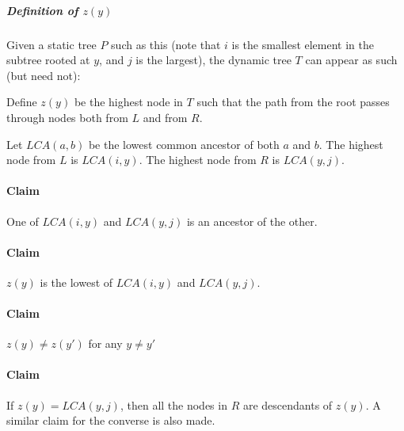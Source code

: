 \documentclass[a4paper]{article}
\begin{document}
\subparagraph{Definition of $z(y)$}
Given a static tree $P$ such as this (note that $i$ is the smallest element in the subtree rooted at $y$, and $j$ is the largest), the dynamic tree $T$ can appear as such (but need not):\\

Define $z(y)$ be the highest node in $T$ such that the path from the root passes through nodes both from $L$ and from $R$.

Let $LCA(a,b)$ be the lowest common ancestor of both $a$ and $b$.
The highest node from $L$ is $LCA(i, y)$. The highest node from $R$ is $LCA(y,j)$.

\paragraph{Claim}
One of $LCA(i,y)$ and $LCA(y,j)$ is an ancestor of the other.

\paragraph{Claim}
$z(y)$ is the lowest of $LCA(i,y)$ and $LCA(y,j)$.

\paragraph{Claim}
$z(y)\ne z(y')$ for any $y \ne y'$

\paragraph{Claim}
If $z(y)=LCA(y,j)$, then all the nodes in $R$ are descendants of $z(y)$. A similar claim for the converse is also made.
\end{document}
